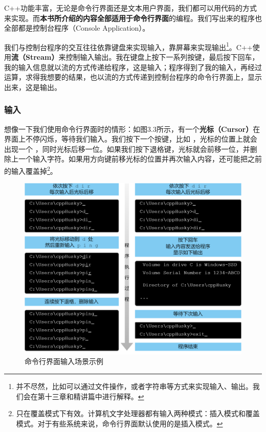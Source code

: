 C++功能丰富，无论是命令行界面还是文本用户界面，我们都可以用代码的方式来实现。而\textbf{本书所介绍的内容全部适用于命令行界面}的编程。我们写出来的程序也全部都是控制台程序（Console Application）。\par
我们与控制台程序的交互往往依靠键盘来实现输入，靠屏幕来实现输出\footnote{并不尽然，比如可以通过文件操作，或者字符串等方式来实现输入、输出。我们会在第十三章和精讲篇中进行解释。}。C++使用\textbf{流（Stream）}来控制输入输出。我在键盘上按下一系列按键，最后按下回车，我的输入信息就以流的方式传递给程序，这是输入；程序得到了我的输入，再经过运算，求得我想要的结果，也以流的方式传递到控制台程序的命令行界面上，显示出来，这是输出。\par
\subsubsection*{输入}
想像一下我们使用命令行界面时的情形：如图3.3所示，有一个\textbf{光标（Cursor）}在界面上不停闪烁，等待我们输入。我们按下一个按键，比如 \lstinline@d@，光标的位置上就会出现一个 \lstinline@d@，同时光标后移一位。如果我们按下退格键，光标就会前移一位，并删除上一个输入字符。如果用方向键前移光标的位置并再次输入内容，还可能把之前的输入覆盖掉\footnote{只在覆盖模式下有效。计算机文字处理器都有输入两种模式：插入模式和覆盖模式。对于有些系统来说，命令行界面默认使用的是插入模式。}。\par
\begin{figure}[htbp]
    \centering
    \includegraphics[width=\textwidth]{../images/generalized_parts/03_input_to_cmd.drawio.png}
    \caption{命令行界面输入场景示例}
\end{figure}
